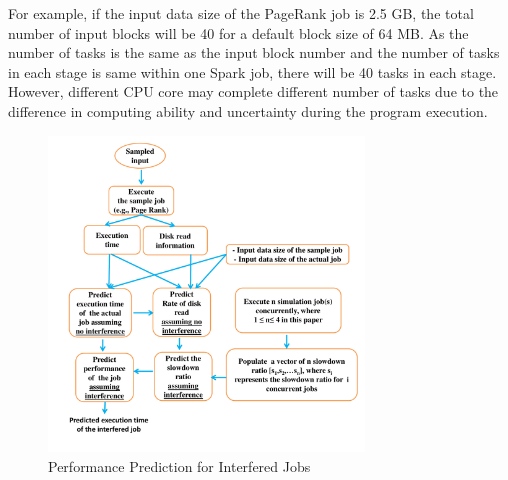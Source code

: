\noindent
For example, if the input data size of the PageRank job is 2.5 GB, the total number of input blocks will be 40 for a default block size of 64 MB. As the number of tasks is the same as the input block number and the number of tasks in each stage is same within one Spark job, there will be 40 tasks in each stage. However, different CPU core may complete different number of tasks due to the difference in computing ability and uncertainty during the program execution. 
\begin{figure}[!t]
\centering
\includegraphics[width=3.3in]{figures/flow1.pdf}
\caption{Performance Prediction for Interfered Jobs}
\label{flow}
\end{figure}

